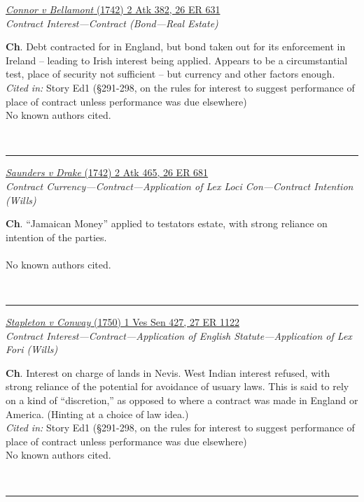 \documentclass[twoside]{article}
\begin{document}
        \begin{small}
        \begin{center}
        \href{https://heinonline.org/HOL/P?h=hein.engrep/engrc0026&i=639}{\textit{Connor v Bellamont} (1742) 2 Atk 382, 26 ER 631} \label{20} \\ 
\textit{Contract Interest---Contract (Bond---Real Estate)}\\
        \end{center}
        \textbf{Ch}. Debt contracted for in England, but bond taken out for its enforcement in Ireland – leading to Irish interest being applied. Appears to be a circumstantial test, place of security not sufficient – but currency and other factors enough.\\\textit{Cited in: }Story Ed1 (§291-298, on the rules for interest to suggest performance of place of contract unless performance was due elsewhere)\\No known authors cited.
        \end{small}\\
        \rule{\textwidth}{0.5pt}
        

        \begin{small}
        \begin{center}
        \href{https://heinonline.org/HOL/P?h=hein.engrep/engrc0026&i=689}{\textit{Saunders v Drake} (1742) 2 Atk 465, 26 ER 681} \label{24} \\ 
\textit{Contract Currency---Contract---Application of Lex Loci Con---Contract Intention (Wills)}\\
        \end{center}
        \textbf{Ch}. “Jamaican Money” applied to testators estate, with strong reliance on intention of the parties.\\\\No known authors cited.
        \end{small}\\
        \rule{\textwidth}{0.5pt}
        

        \begin{small}
        \begin{center}
        \href{https://heinonline.org/HOL/P?h=hein.engrep/engrc0027&i=1130}{\textit{Stapleton v Conway} (1750) 1 Ves Sen 427, 27 ER 1122} \label{25} \\ 
\textit{Contract Interest---Contract---Application of English Statute---Application of Lex Fori (Wills)}\\
        \end{center}
        \textbf{Ch}. Interest on charge of lands in Nevis. West Indian interest refused, with strong reliance of the potential for avoidance of usuary laws.  This is said to rely on a kind of “discretion,” as opposed to where a contract was made in England or America. (Hinting at a choice of law idea.)\\\textit{Cited in: }Story Ed1 (§291-298, on the rules for interest to suggest performance of place of contract unless performance was due elsewhere)\\No known authors cited.
        \end{small}\\
        \rule{\textwidth}{0.5pt}
        
\end{document}
